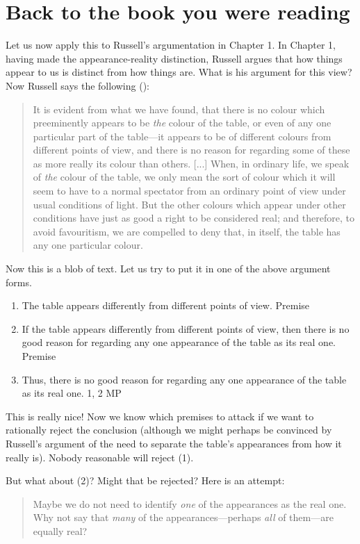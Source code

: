 \documentclass[oneside,letterpaper,12pt]{book}
\begin{document}
\section*{Back to the book you were reading}
Let us now apply this to Russell's argumentation in Chapter 1. In Chapter 1, having made the appearance-reality distinction, Russell argues that how things appear to us is distinct from how things are. What is his argument for this view? Now Russell says the following (\pageref{evident}):
\begin{quote}
	It is evident from what we have found, that there is no colour which preeminently appears to be \textit{the} colour of the table, or even of any one particular part of the table---it appears to be of different colours from different points of view, and there is no reason for regarding some of these as more really its colour than others. [...] When, in ordinary life, we speak of \textit{the} colour of the table, we only mean the sort of colour which it will seem to have to a normal spectator from an ordinary point of view under usual conditions of light. But the other colours which appear under other conditions have just as good a right to be considered real; and therefore, to avoid favouritism, we are compelled to deny that, in itself, the table has any one particular colour.
\end{quote}
Now this is a blob of text. Let us try to put it in one of the above argument forms.
\begin{enumerate}
	\item The table appears differently from different points of view. \hfill Premise
	\item If the table appears differently from different points of view, then there is no good reason for regarding any one appearance of the table as its real one. \hfill Premise
	\item Thus, there is no good reason for regarding any one appearance of the table as its real one. \hfill 1, 2 MP
\end{enumerate}
This is really nice! Now we know which premises to attack if we want to rationally reject the conclusion (although we might perhaps be convinced by Russell's argument of the need to separate the table's appearances from how it really is). Nobody reasonable will reject (1). \\
\par But what about (2)? Might that be rejected? Here is an attempt:
\begin{quote}
	Maybe we do not need to identify \textit{one} of the appearances as the real one. Why not say that \textit{many} of the appearances---perhaps \textit{all} of them---are equally real? %
\end{quote}
\end{document}

